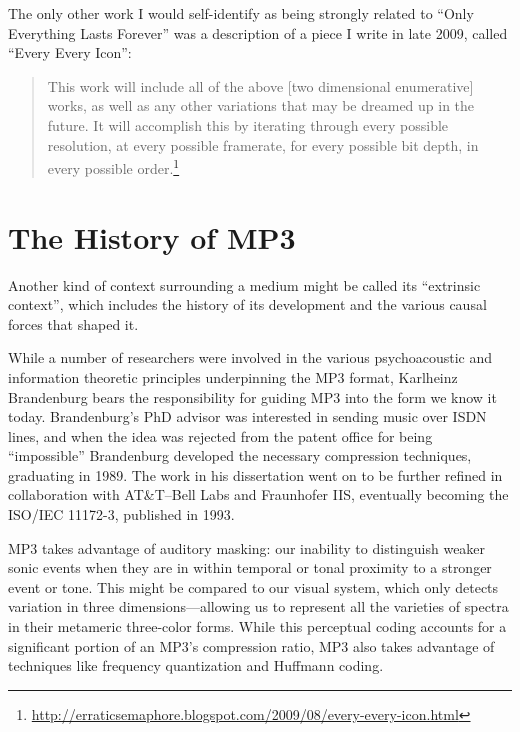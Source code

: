 \documentclass{thesis}
\begin{document}
The only other work I would self-identify as being strongly related to ``Only Everything Lasts Forever'' was a description of a piece I write in late 2009, called ``Every Every Icon'':
	
	\begin{quote}
	This work will include all of the above [two dimensional enumerative] works, as well as any other variations that may be dreamed up in the future. It will accomplish this by iterating through every possible resolution, at every possible framerate, for every possible bit depth, in every possible order.\footnote{\url{http://erraticsemaphore.blogspot.com/2009/08/every-every-icon.html}}
	\end{quote}	

\section{The History of MP3}

Another kind of context surrounding a medium might be called its ``extrinsic context'', which includes the history of its development and the various causal forces that shaped it.

While a number of researchers were involved in the various psychoacoustic and information theoretic principles underpinning the MP3 format, Karlheinz Brandenburg bears the responsibility for guiding MP3 into the form we know it today. Brandenburg's PhD advisor was interested in sending music over ISDN lines, and when the idea was rejected from the patent office for being ``impossible'' Brandenburg developed the necessary compression techniques, graduating in 1989\cite{brandenburg_interviews_2004}. The work in his dissertation went on to be further refined in collaboration with AT\&T--Bell Labs and Fraunhofer IIS, eventually becoming the ISO/IEC 11172-3, published in 1993.

MP3 takes advantage of auditory masking: our inability to distinguish weaker sonic events when they are in within temporal or tonal proximity to a stronger event or tone.\cite{Ruckert05} This might be compared to our visual system, which only detects variation in three dimensions---allowing us to represent all the varieties of spectra in their metameric three-color forms. While this perceptual coding accounts for a significant portion of an MP3's compression ratio, MP3 also takes advantage of techniques like frequency quantization and Huffmann coding.
\end{document}
